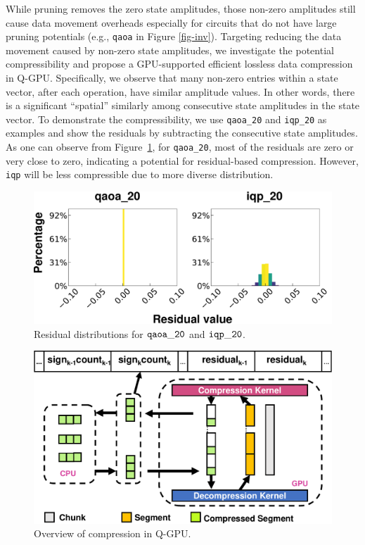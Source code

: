  While pruning removes the zero state amplitudes, those non-zero amplitudes still cause data movement overheads especially for circuits that do not have large pruning potentials (e.g., {\tt qaoa} in Figure \ref{fig-inv}). Targeting reducing the data movement caused by non-zero state amplitudes, we investigate the potential compressibility and propose a GPU-supported efficient lossless data compression in Q-GPU. Specifically, we observe that many non-zero entries within a state vector, after each operation, have similar amplitude values. In other words, there is a significant ``spatial'' similarly among consecutive state amplitudes in the state vector. To demonstrate the compressibility, we use {\tt qaoa\_20} and {\tt iqp\_20} as examples and show the residuals by subtracting the consecutive state amplitudes. As one can observe from Figure~\ref{fig:residual}, for {\tt qaoa\_20}, most of the residuals are zero or very close to zero, indicating a potential for residual-based compression. However, {\tt iqp} will be less compressible due to more diverse distribution. 

\begin{figure}[h!]
    \includegraphics[width=\textwidth]{Images/appendix2/section-4/residual.pdf}
    \centering
    \caption{Residual distributions for ${\tt qaoa\_20}$ and ${\tt iqp\_20}$.}
\label{fig:residual}
\vspace{-5pt}
\end{figure}

\begin{figure}[h!]
\includegraphics[width=\textwidth]{Images/appendix2/section-4/compress.pdf}
    \centering
    \caption{Overview of compression in Q-GPU.}
    \label{fig:compression-flow}
    \vspace{-5pt}
\end{figure}

